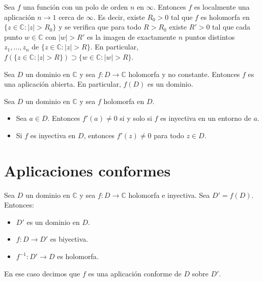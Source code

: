 \begin{theorem}
    Sea $f$ una función con un polo de orden $n$ en $\infty$.
    Entonces $f$ es localmente una aplicación $n \to 1$ cerca de $\infty$.
    Es decir, existe $R_0 > 0$ tal que $f$ es holomorfa en $\{z \in \mathbb{C} : |z| > R_0\}$ y se verifica que para todo $R > R_0$ existe $R' > 0$ tal que cada punto $w \in \mathbb{C}$ con $|w| > R'$ es la imagen de exactamente $n$ puntos distintos $z_1, \dots, z_n$ de $\{z \in \mathbb{C} : |z| > R\}$.
    En particular, $f(\{z \in \mathbb{C} : |z| > R\}) \supset \{w \in \mathbb{C} : |w| > R\}$.
\end{theorem}

\begin{theorem}
    Sea $D$ un dominio en $\mathbb{C}$ y sea $f: D \to \mathbb{C}$ holomorfa y no constante.
    Entonces $f$ es una aplicación abierta.
    En particular, $f(D)$ es un dominio.
\end{theorem}

\begin{lemma}
    Sea $D$ un dominio en $\mathbb{C}$ y sea $f$ holomorfa en $D$.
    \begin{itemize}
        \item Sea $a \in D$.
              Entonces $f'(a) \neq 0$ si y solo si $f$ es inyectiva en un entorno de $a$.
        \item Si $f$ es inyectiva en $D$, entonces $f'(z) \neq 0$ para todo $z \in D$.
    \end{itemize}
\end{lemma}

\section{Aplicaciones conformes}
\begin{definition}
    Sea $D$ un dominio en $\mathbb{C}$ y sea $f: D \to \mathbb{C}$ holomorfa e inyectiva.
    Sea $D' = f(D)$.
    Entonces:
    \begin{itemize}
        \item $D'$ es un dominio en $D$.
        \item $f: D \to D'$ es biyectiva.
        \item $f^{-1}: D' \to D$ es holomorfa.
    \end{itemize}

    En ese caso decimos que $f$ es una aplicación conforme de $D$ sobre $D'$.
\end{definition}

